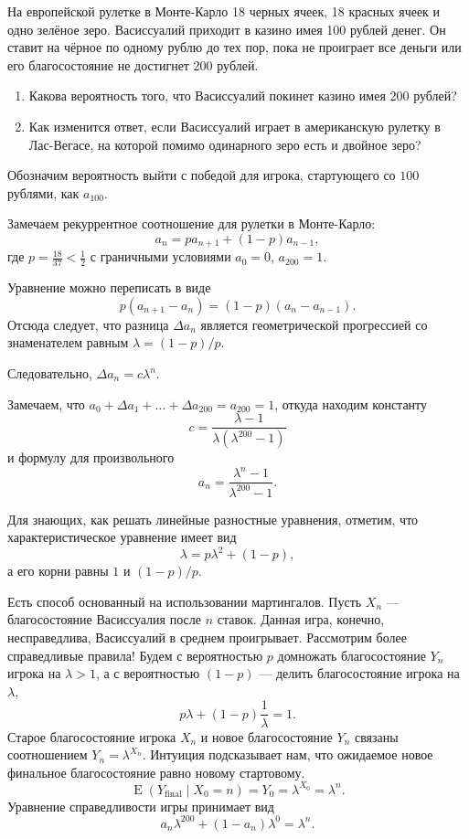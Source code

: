 \documentclass[nobib]{tufte-handout}
\theoremstyle{definition}
\newcounter{problem}
\newenvironment{problem}%
{%
\refstepcounter{problem}%
     \hypertarget{problem:{\theproblem}}{}
     \Writetofile{solution_file}{\protect\hypertarget{soln:\theproblem}{}}
     \begin{myenum}[label=\bfseries\protect\hyperlink{soln:\theproblem}{\theproblem},ref=\theproblem]
     \item%
    }%
    {%
    \end{myenum}}
\DeclareMathOperator{\E}{E}
\begin{document}
\begin{problem}
На европейской рулетке в Монте-Карло 18 черных ячеек, 18 красных ячеек и одно зелёное зеро.
Васиссуалий приходит в казино имея 100 рублей денег.
Он ставит на чёрное по одному рублю до тех пор,
пока не проиграет все деньги или его благосостояние не достигнет 200 рублей.

\begin{enumerate}
\item Какова вероятность того, что Васиссуалий покинет казино имея 200 рублей?
\item Как изменится ответ, если Васиссуалий играет в американскую рулетку в Лас-Вегасе,
на которой помимо одинарного зеро есть и двойное зеро?
\end{enumerate}

\begin{sol}
Обозначим вероятность выйти с победой для игрока, стартующего со $100$ рублями, как $a_{100}$.

Замечаем рекуррентное соотношение для рулетки в Монте-Карло:
\[
a_n = p a_{n+1} + (1-p) a_{n-1},  
\]
где $p = \frac{18}{37} < \frac{1}{2}$  с граничными условиями $a_0 = 0$, $a_{200} = 1$. 

Уравнение можно переписать в виде
\[
p(a_{n+1} - a_n) = (1-p) (a_n - a_{n-1}).
\]
Отсюда следует, что разница $\Delta a_n$ является геометрической прогрессией 
со знаменателем равным $\lambda = (1-p) / p$.

Следовательно, $\Delta a_n = c \lambda^n$. 

Замечаем, что $a_0 + \Delta a_1 + \ldots + \Delta a_{200} = a_{200} = 1$,
откуда находим константу
\[
  c = \frac{\lambda - 1}{\lambda (\lambda^{200} - 1)}
\]
и формулу для произвольного 
\[
a_n = \frac{\lambda^{n} - 1}{\lambda^{200} - 1}.
\]

Для знающих, как решать линейные разностные уравнения, отметим, 
что характеристическое уравнение имеет вид 
\[
  \lambda = p \lambda^2 + (1-p),
\]
а его корни равны $1$ и $(1-p)/p$.

Есть способ основанный на использовании мартингалов. 
Пусть $X_n$ — благосостояние Васиссуалия после $n$ ставок.
Данная игра, конечно, несправедлива, Васиссуалий в среднем проигрывает. 
Рассмотрим более справедливые правила!
Будем с вероятностью $p$ домножать благосостояние $Y_n$ игрока на $\lambda > 1$, 
а с вероятностью $(1-p)$ — делить благосостояние игрока на $\lambda$,
\[
p \lambda + (1-p) \frac{1}{\lambda} = 1. 
\]
Старое благосостояние игрока $X_n$ и новое благосостояние $Y_n$ связаны соотношением $Y_n = \lambda^{X_n}$.
Интуиция подсказывает нам, что ожидаемое новое финальное благосостояние равно новому стартовому. 
\[
\E(Y_{\text{final}} \mid X_0 = n) = Y_0 = \lambda^{X_0} = \lambda^n.
\]
Уравнение справедливости игры принимает вид
\[
  a_n \lambda^{200} + (1 - a_n) \lambda^0=  \lambda^n.
\]


\end{sol}
\end{problem}
\end{document}
